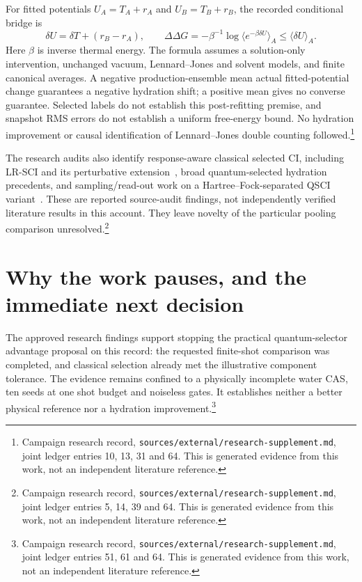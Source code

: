 \documentclass{article}
\newcommand{\record}[1]{\footnote{Campaign research record, \texttt{sources/external/research-supplement.md}, #1. This is generated evidence from this work, not an independent literature reference.}}
\begin{document}
For fitted potentials \(U_A=T_A+r_A\) and \(U_B=T_B+r_B\), the recorded conditional bridge is
\[
 \delta U=\delta T+(r_B-r_A),\qquad
 \Delta\Delta G=-\beta^{-1}\log\langle e^{-\beta\delta U}\rangle_A
 \leq\langle\delta U\rangle_A.
\]
Here \(\beta\) is inverse thermal energy. The formula assumes a solution-only intervention, unchanged vacuum, Lennard--Jones and solvent models, and finite canonical averages. A negative production-ensemble mean actual fitted-potential change guarantees a negative hydration shift; a positive mean gives no converse guarantee. Selected labels do not establish this post-refitting premise, and snapshot RMS errors do not establish a uniform free-energy bound. No hydration improvement or causal identification of Lennard--Jones double counting followed.\record{joint ledger entries 10, 13, 31 and 64}

The research audits also identify response-aware classical selected CI, including LR-SCI and its perturbative extension~\cite{LR,LRPT}, broad quantum-selected hydration precedents, and sampling/read-out work on a Hartree--Fock-separated QSCI variant~\cite{readout}. These are reported source-audit findings, not independently verified literature results in this account. They leave novelty of the particular pooling comparison unresolved.\record{joint ledger entries 5, 14, 39 and 64}

\section{Why the work pauses, and the immediate next decision}
The approved research findings support stopping the practical quantum-selector advantage proposal on this record: the requested finite-shot comparison was completed, and classical selection already met the illustrative component tolerance. The evidence remains confined to a physically incomplete water CAS, ten seeds at one shot budget and noiseless gates. It establishes neither a better physical reference nor a hydration improvement.\record{joint ledger entries 51, 61 and 64}
\end{document}
